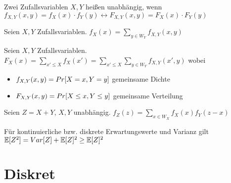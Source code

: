 \begin{definition}
	Zwei Zufallsvariablen $X,Y$ heißen unabhängig, wenn $f_{X,Y}(x,y) = f_X(x) \cdot f_Y(y) \leftrightarrow F_{X,Y}(x,y) = F_X(x) \cdot F_Y(y)$
\end{definition}

\begin{definition}
	Seien $X,Y$ Zufallsvariablen.
	$f_X(x) = \sum_{y \in W_Y} f_{X,Y}(x,y)$
\end{definition}

\begin{definition}
	Seien $X,Y$ Zufallsvariablen.
	$F_X(x) = \sum_{x' \leq X} f_X(x') = \sum_{x' \leq X} \sum_{y \in W_Y} f_{X,Y}(x',y)$
	wobei
	\begin{itemize}[noitemsep]
		\item $f_{X,Y}(x,y) = Pr[X = x, Y = y]$ gemeinsame Dichte
		\item $F_{X,Y}(x,y) = Pr[X \leq x, Y \leq y]$ gemeinsame Verteilung
	\end{itemize}
\end{definition}

\begin{definition}
	Seien $Z = X + Y$, $X,Y$ unabhängig.
	$f_Z(z) = \sum_{x \in W_X} f_X(x)f_Y(z-x)$
\end{definition}


\begin{definition}
	Für kontinuierliche bzw. diskrete Erwartungswerte und Varianz gilt
	$\mathbb{E}[Z^2] = Var[Z] + \mathbb{E}[Z]^2 \geq \mathbb{E}[Z]^2$
\end{definition}

\pagebreak
	
\section{Diskret}

